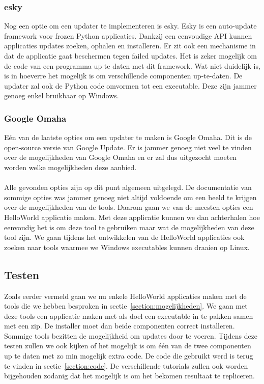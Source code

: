 \documentclass{article}
\begin{document}
\subsubsection{esky \citep{eskyMain}}
Nog een optie om een updater te implementeren is esky.
Esky is een auto-update framework voor frozen Python applicaties.
Dankzij een eenvoudige API kunnen applicaties updates zoeken, ophalen en installeren.
Er zit ook een mechanisme in dat de applicatie gaat beschermen tegen failed updates.
Het is zeker mogelijk om de code van een programma up te daten met dit framework.
Wat niet duidelijk is, is in hoeverre het mogelijk is om verschillende componenten up-te-daten.
De updater zal ook de Python code omvormen tot een executable.
Deze zijn jammer genoeg enkel bruikbaar op Windows.

\subsubsection{Google Omaha \citep{omahaMain}}
E\'en van de laatste opties om een updater te maken is Google Omaha.
Dit is de open-source versie van Google Update.
Er is jammer genoeg niet veel te vinden over de mogelijkheden van Google Omaha en er zal dus uitgezocht moeten worden welke mogelijkheden deze aanbied.

\paragraph{}
Alle gevonden opties zijn op dit punt algemeen uitgelegd.
De documentatie van sommige opties was jammer genoeg niet altijd voldoende om een beeld te krijgen over de mogelijkheden van de tools.
Daarom gaan we van de meesten opties een HelloWorld applicatie maken.
Met deze applicatie kunnen we dan achterhalen hoe eenvoudig het is om deze tool te gebruiken maar wat de mogelijkheden van deze tool zijn.
We gaan tijdens het ontwikkelen van de HelloWorld applicaties ook zoeken naar tools waarmee we Windows executables kunnen draaien op Linux.

\subsection{Testen}
Zoals eerder vermeld gaan we nu enkele HelloWorld applicaties maken met de tools die we hebben besproken in sectie~\vref{section:mogelijkheden}.
We gaan met deze tools een applicatie maken met als doel een executable in te pakken samen met een zip.
De installer moet dan beide componenten correct installeren.
Sommige tools bezitten de mogelijkheid om updates door te voeren.
Tijdens deze testen zullen we ook kijken of het mogelijk is om \'e\'en van de twee componenten up te daten met zo min mogelijk extra code.
De code die gebruikt werd is terug te vinden in sectie~\vref{section:code}.
De verschillende tutorials zullen ook worden bijgehouden zodanig dat het mogelijk is om het bekomen resultaat te repliceren.
\end{document}

